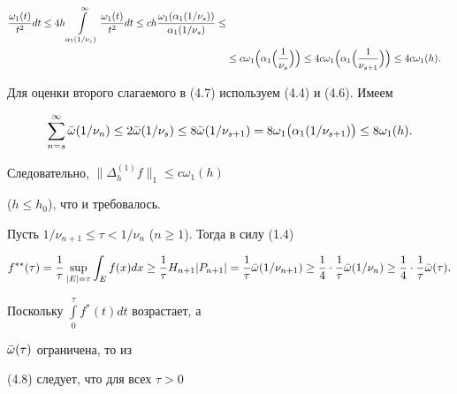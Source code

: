 \begin{pf}
\begin{align*}
\frac{\omega_1(t)}{t^2}dt \le 


4h\int\limits^\infty_{\alpha_1(1/\nu_s)} 


\frac{\omega_1(t)}{t^2}dt 


\le ch\frac{\omega_1(\alpha_1(1/\nu_s))}{\alpha_1(1/\nu_s)} \le \\ 


% 


& \le c\omega_1\Bigl(\alpha_1\Bigl(\frac{1}{\nu_s}\Bigr)\Bigr) \le 


4c\omega_1\Bigl(\alpha_1\Bigl(\frac{1}{\nu_{s+1}}\Bigr)\Bigr) \le 


4c\omega_1(h). 


\end{align*} 


Для оценки второго слагаемого в (4.7) используем (4.4) и (4.6). Имеем 


$$ 


\sum^\infty_{n=s}\Bar\omega(1/\nu_n)\le 2\Bar\omega(1/\nu_s) 


\le 8\Bar\omega(1/\nu_{s+1})= 


8\omega_1\bigl(\alpha_1(1/\nu_{s+1})\bigr)\le 8\omega_1(h). 


$$ 


Следовательно, $\|\Delta_h^{(1)}f\|_1\le c\omega_1(h)$ 


($h\le h_0$), что и требовалось. 


 


Пусть $1/\nu_{n+1}\le\tau<1/\nu_n$ ($n\ge 1$). Тогда в силу (1.4) 


\begin{equation} 


f^{**}(\tau)=\frac{1}{\tau}\sup_{|E|=\tau}\int_E f(x)dx \ge 


\frac{1}{\tau}H_{n+1}|P_{n+1}|=\frac{1}{\tau}\Bar\omega(1/\nu_{n+1}) \ge 


\frac{1}{4}\cdot\frac{1}{\tau}\Bar\omega(1/\nu_n) \ge 


\frac{1}{4}\cdot\frac{1}{\tau}\Bar\omega(\tau). 


\end{equation} 


Поскольку $\int\limits_0^\tau f^*(t)dt$ возрастает, а 


$\Bar\omega(\tau)$ ограничена, то из 


(4.8) следует, что для всех $\tau>0$ 


\begin{equation} 



\end{equation}
\end{pf}
